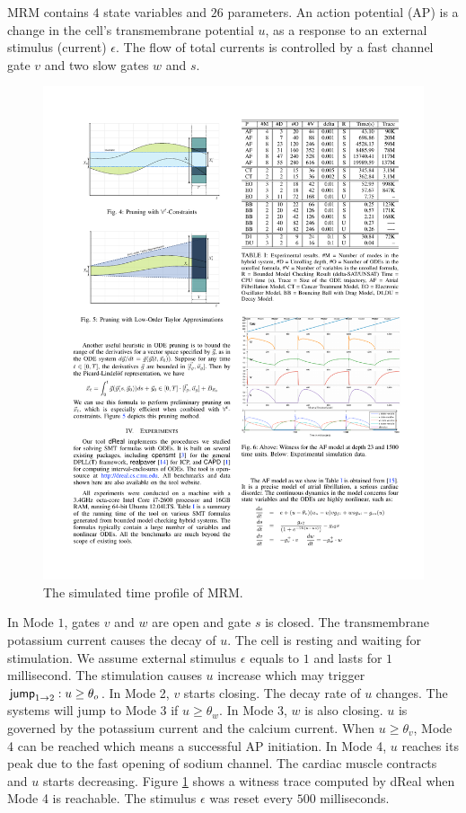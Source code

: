 MRM contains $4$ state variables and $26$ parameters. An action potential (AP) is a change in the cell's transmembrane potential $u$, as a response to an external stimulus (current) $\epsilon$. The flow of total currents is controlled by a fast channel gate $v$ and two slow gates $w$ and $s$. %
%
%
\begin{figure}[h]
\centering
\includegraphics[scale=1.2]{fig-cardiactraj}
\caption{The simulated time profile of MRM.}
\label{ctrace}
\end{figure}
%
In Mode $1$, gates $v$ and $w$ are open and gate $s$ is closed. The transmembrane potassium current causes the decay of $u$. The cell is resting and waiting for stimulation. We assume external stimulus $\epsilon$ equals to $1$ and lasts for $1$ millisecond. The stimulation causes $u$ increase which may trigger $\mathsf{jump}_{1 \rightarrow 2}: u \geq \theta_o$. In Mode 2, $v$ starts closing. The decay rate of $u$ changes. The systems will jump to Mode 3 if $u \geq \theta_w$. In Mode 3, $w$ is also closing. $u$ is governed by the potassium current and the calcium current. When $u \geq \theta_v$, Mode 4 can be reached which means a successful AP initiation. In Mode 4, $u$ reaches its peak due to the fast opening of sodium channel. The cardiac muscle contracts and $u$ starts decreasing. Figure \ref{ctrace} shows a witness trace computed by dReal when Mode 4 is reachable. The stimulus $\epsilon$ was reset every $500$ milliseconds.







